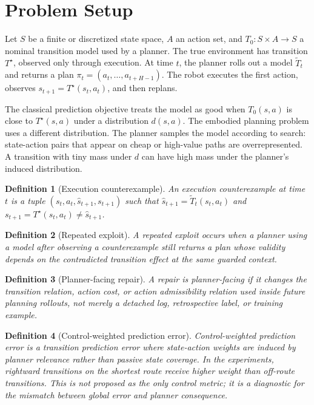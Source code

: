 \documentclass{article}
\newtheorem{definition}{Definition}
\begin{document}
\section{Problem Setup}

Let $S$ be a finite or discretized state space, $A$ an action set, and $T_0:S\times A\rightarrow S$ a nominal transition model used by a planner. The true environment has transition $T^\star$, observed only through execution. At time $t$, the planner rolls out a model $\tilde{T}_t$ and returns a plan $\pi_t=(a_t,\ldots,a_{t+H-1})$. The robot executes the first action, observes $s_{t+1}=T^\star(s_t,a_t)$, and then replans.

The classical prediction objective treats the model as good when $T_0(s,a)$ is close to $T^\star(s,a)$ under a distribution $d(s,a)$. The embodied planning problem uses a different distribution. The planner samples the model according to search: state-action pairs that appear on cheap or high-value paths are overrepresented. A transition with tiny mass under $d$ can have high mass under the planner's induced distribution.

\begin{definition}[Execution counterexample]
An execution counterexample at time $t$ is a tuple $(s_t,a_t,\hat{s}_{t+1},s_{t+1})$ such that $\hat{s}_{t+1}=\tilde{T}_t(s_t,a_t)$ and $s_{t+1}=T^\star(s_t,a_t)\neq \hat{s}_{t+1}$.
\end{definition}

\begin{definition}[Repeated exploit]
A repeated exploit occurs when a planner using a model after observing a counterexample still returns a plan whose validity depends on the contradicted transition effect at the same guarded context.
\end{definition}

\begin{definition}[Planner-facing repair]
A repair is planner-facing if it changes the transition relation, action cost, or action admissibility relation used inside future planning rollouts, not merely a detached log, retrospective label, or training example.
\end{definition}

\begin{definition}[Control-weighted prediction error]
Control-weighted prediction error is a transition prediction error where state-action weights are induced by planner relevance rather than passive state coverage. In the experiments, rightward transitions on the shortest route receive higher weight than off-route transitions. This is not proposed as the only control metric; it is a diagnostic for the mismatch between global error and planner consequence.
\end{definition}
\end{document}
